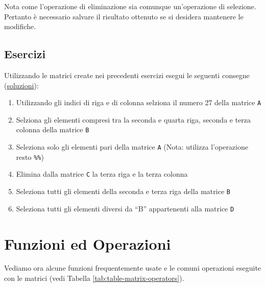 \documentclass[
]{book}
\providecommand{\tightlist}{%
  \setlength{\itemsep}{0pt}\setlength{\parskip}{0pt}}
\begin{document}
Nota come l'operazione di eliminazione sia comunque un'operazione di selezione. Pertanto è necessario salvare il risultato ottenuto se si desidera mantenere le modifiche.

\hypertarget{esercizi-7}{%
\subsection*{Esercizi}\label{esercizi-7}}

Utilizzando le matrici create nei precedenti esercizi esegui le seguenti consegne (\href{https://github.com/psicostat/Introduction2R/blob/master/exercises/chapter-09-matrices.R}{soluzioni}):

\begin{enumerate}
\def\labelenumi{\arabic{enumi}.}
\tightlist
\item
  Utilizzando gli indici di riga e di colonna selziona il numero 27 della matrice \texttt{A}
\item
  Selziona gli elementi compresi tra la seconda e quarta riga, seconda e terza colonna della matrice \texttt{B}
\item
  Seleziona solo gli elementi pari della matrice \texttt{A} (Nota: utilizza l'operazione resto \texttt{\%\%})
\item
  Elimina dalla matrice \texttt{C} la terza riga e la terza colonna
\item
  Seleziona tutti gli elementi della seconda e terza riga della matrice \texttt{B}
\item
  Seleziona tutti gli elementi diversi da ``B'' appartenenti alla matrice \texttt{D}
\end{enumerate}

\hypertarget{funzioni-ed-operazioni}{%
\section{Funzioni ed Operazioni}\label{funzioni-ed-operazioni}}

Vediamo ora alcune funzioni frequentemente usate e le comuni operazioni eseguite con le matrici (vedi Tabella \ref{tab:table-matrix-operators}).
\end{document}
